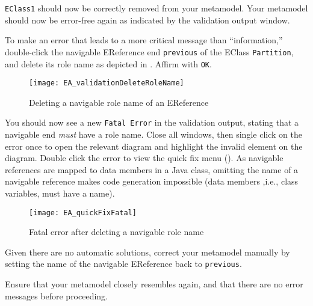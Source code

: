 \begin{stepbystep}
\vspace{0.5cm}

\item \texttt{EClass1} should now be correctly removed from your metamodel. Your metamodel should now be error-free again as indicated by
the validation output window.

\item To make an error that leads to a more critical message than ``information,'' double-click the navigable EReference end
\texttt{previous} of the EClass \texttt{Partition}, and delete its role name as depicted in . Affirm with \texttt{OK}.

\begin{figure}[htbp]
    \centering
  \texttt{[image: EA\_validationDeleteRoleName]}
    \caption{Deleting a navigable role name of an EReference}
    \label{ea:delete-role-name}
\end{figure}

\item You should now see a new \texttt{Fatal Error} in the validation output, stating that a navigable end \emph{must} have a role name.
Close all windows, then single click on the error once to open the relevant diagram and highlight the invalid element on the diagram. Double click the error to
view the quick fix menu (). As navigable references are mapped to data members in a Java class, omitting the name of a navigable
reference makes code generation impossible (data members ,i.e., class variables, must have a name).

\begin{figure}[htbp]
	\centering
  \texttt{[image: EA\_quickFixFatal]}
	\caption{Fatal error after deleting a navigable role name}
	\label{ea:fatal-error}
\end{figure}

\item Given there are no automatic solutions, correct your metamodel manually by setting the name of the navigable EReference back to
\texttt{previous}.

\item Ensure that your metamodel closely resembles  again, and that there are no error messages before
proceeding.

\end{stepbystep}

\vspace*{1cm}

